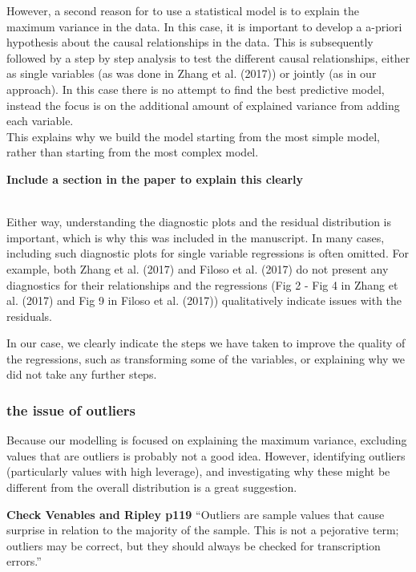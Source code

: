 \documentclass[]{elsarticle} %
\begin{document}
However, a second reason for to use a statistical model is to explain the maximum variance in the data. In this case, it is important to develop a a-priori hypothesis about the causal relationships in the data. This is subsequently followed by a step by step analysis to test the different causal relationships, either as single variables (as was done in Zhang et al. (2017)) or jointly (as in our approach). In this case there is no attempt to find the best predictive model, instead the focus is on the additional amount of explained variance from adding each variable.\\
This explains why we build the model starting from the most simple model, rather than starting from the most complex model.

\hfill\break
\textbf{Include a section in the paper to explain this clearly}\\
\strut \\

Either way, understanding the diagnostic plots and the residual distribution is important, which is why this was included in the manuscript. In many cases, including such diagnostic plots for single variable regressions is often omitted. For example, both Zhang et al. (2017) and Filoso et al. (2017) do not present any diagnostics for their relationships and the regressions (Fig 2 - Fig 4 in Zhang et al. (2017) and Fig 9 in Filoso et al. (2017)) qualitatively indicate issues with the residuals.

In our case, we clearly indicate the steps we have taken to improve the quality of the regressions, such as transforming some of the variables, or explaining why we did not take any further steps.

\hypertarget{the-issue-of-outliers}{%
\subsubsection{the issue of outliers}\label{the-issue-of-outliers}}

Because our modelling is focused on explaining the maximum variance, excluding values that are outliers is probably not a good idea. However, identifying outliers (particularly values with high leverage), and investigating why these might be different from the overall distribution is a great suggestion.

\textbf{Check Venables and Ripley p119}
``Outliers are sample values that cause surprise in relation to the majority of the sample. This is not a pejorative term; outliers may be correct, but they should always be checked for transcription errors.''
\end{document}
